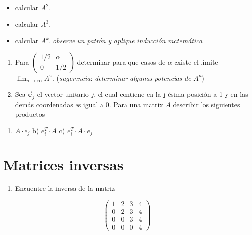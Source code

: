 \documentclass[
]{article}
\providecommand{\tightlist}{%
  \setlength{\itemsep}{0pt}\setlength{\parskip}{0pt}}
\begin{document}
\begin{itemize}
\item
  calcular \(A^2\).
\item
  calcular \(A^3\).
\item
  calcular \(A^{k}\). \emph{observe} \emph{un} \emph{patrón} \emph{y}
  \emph{aplique} \emph{inducción} \emph{matemática}.
\end{itemize}

\begin{enumerate}
\def\labelenumi{\arabic{enumi}.}
\item
  Para \(\begin{pmatrix} 1/2 & \alpha \\ 0 & 1/2 \end{pmatrix}\)
  determinar para que casos de \(\alpha\) existe el límite
  \(\lim_{n\rightarrow \infty} A^{n}\). (\emph{sugerencia}:
  \emph{determinar} \emph{algunas} \emph{potencias} \emph{de} \(A^n\))
\item
  Sea \(\vec{\mathbf{e}}_j\) el vector unitario \(j\), el cual contiene
  en la j-ésima posición a 1 y en las demás coordenadas es igual a 0.
  Para una matrix \(A\) describir los siguientes productos
\end{enumerate}

\begin{enumerate}
\def\labelenumi{\alph{enumi})}
\tightlist
\item
  \(A\cdot e_j\) b) \(e_i^T\cdot A\) c) \(e_i^T\cdot A\cdot e_j\)
\end{enumerate}

\hypertarget{matrices-inversas}{%
\section{Matrices inversas}\label{matrices-inversas}}

\begin{enumerate}
\def\labelenumi{\arabic{enumi}.}
\tightlist
\item
  Encuentre la inversa de la matriz
\end{enumerate}

\begin{equation}
  \begin{pmatrix}
    1 & 2 & 3 & 4 \\
    0 & 2 & 3 & 4 \\
    0 & 0 & 3 & 4 \\
    0 & 0 & 0 & 4
  \end{pmatrix}
\end{equation}
\end{document}
